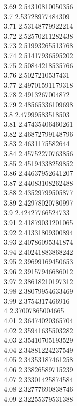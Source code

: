 {3.69	2.54310810050356\\
3.7	2.53728977484309\\
3.71	2.53148779922214\\
3.72	2.52570211282438\\
3.73	2.51993265513768\\
3.74	2.51417936595202\\
3.75	2.50844218535766\\
3.76	2.5027210537431\\
3.77	2.49701591179318\\
3.78	2.4913267004872\\
3.79	2.48565336109698\\
3.8	2.47999583518503\\
3.81	2.47435406460261\\
3.82	2.46872799148796\\
3.83	2.4631175582644\\
3.84	2.45752270763856\\
3.85	2.45194338259852\\
3.86	2.44637952641207\\
3.87	2.44083108262488\\
3.88	2.43529799505877\\
3.89	2.42978020780997\\
3.9	2.42427766524733\\
3.91	2.41879031201065\\
3.92	2.41331809300894\\
3.93	2.40786095341874\\
3.94	2.40241883868242\\
3.95	2.39699169450653\\
3.96	2.39157946686012\\
3.97	2.38618210197312\\
3.98	2.38079954633469\\
3.99	2.3754317466916\\
4	2.37007865004665\\
4.01	2.36474020365704\\
4.02	2.35941635503282\\
4.03	2.35410705193529\\
4.04	2.34881224237549\\
4.05	2.34353187461258\\
4.06	2.33826589715239\\
4.07	2.33301425874584\\
4.08	2.32777690838746\\
4.09	2.32255379531388\\
}
